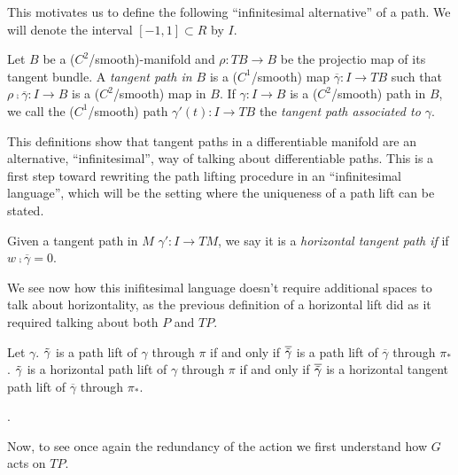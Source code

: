 This motivates us to define the following ``infinitesimal alternative'' of a path. We will denote the interval $[-1, 1] \subset R$ by $I$.

\begin{definition} 
Let $B$ be a ($C^2$/smooth)-manifold and $\rho: TB \to B$ be the projectio map of its tangent bundle. A \emph{tangent path in $B$} is a ($C^1$/smooth) map $\overline{\gamma}:I \to TB$ such that $\rho \comp \overline{\gamma} : I \to B$ is a ($C^2$/smooth) map in $B$. If $\gamma: I \to B$ is a ($C^2$/smooth) path in $B$, we call the ($C^1$/smooth) path $\gamma'(t): I \to TB$ the \emph{tangent path associated to $\gamma$}.   
\end{definition}

This definitions show that tangent paths in a differentiable manifold are an alternative, ``infinitesimal'', way of talking about differentiable paths. This is a first step toward rewriting the path lifting procedure in an ``infinitesimal language'', which will be the setting where the uniqueness of a path lift can be stated. 

\begin{definition}
Given a tangent path in $M$  $\gamma': I \to TM$, we say it is a \emph{horizontal tangent path if} if $w \comp \overline{\gamma} = 0$.
\end{definition}

We see now how this inifitesimal language doesn't require additional spaces to talk about horizontality, as the previous definition of a horizontal lift did as it required talking about both $P$ and $TP$.

\begin{theorem}
Let $\gamma$. $\Tilde{\gamma}$ is a path lift of $\gamma$ through $\pi$ if and only if $\overline{\Tilde{\gamma}}$ is a path lift of $\overline{\gamma}$ through $\pi_*$. $\Tilde{\gamma}$ is a horizontal path lift of $\gamma$ through $\pi$ if and only if $\overline{\Tilde{\gamma}}$ is a horizontal tangent path lift of $\overline{\gamma}$ through $\pi_*$.
\end{theorem}

. 

Now, to see once again the redundancy of the action we first understand how $G$ acts on $TP$.

